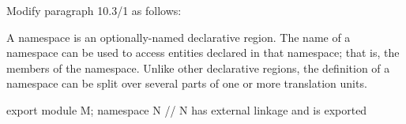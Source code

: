 \noindent
Modify paragraph 10.3/1 as follows:
\begin{std.txt}
  \resetalinea[0]
  \alinea
  A namespace is an optionally-named declarative region. The name of a
  namespace can be used to access entities declared in that namespace;
  that is, the members of the namespace. Unlike other declarative
  regions, the definition of a namespace can be split over several
  parts of one or more translation units.
  \begin{undecided}
  \color{addclr}
  \begin{example}
  \begin{codeblock}
    export module M;
    namespace N {    // N has external linkage and is exported
    }
  \end{codeblock}
  \end{example}
  \end{undecided}
\end{std.txt}

